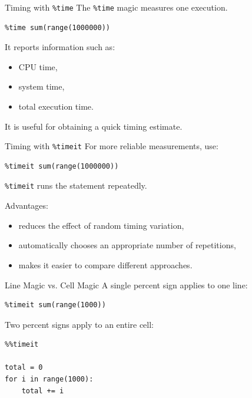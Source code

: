 \documentclass[aspectratio=169]{beamer}
\begin{document}
\begin{frame}[fragile]{Timing with \texttt{\%time}}
The \texttt{\%time} magic measures one execution.

\begin{lstlisting}
%time sum(range(1000000))
\end{lstlisting}

It reports information such as:
\begin{itemize}
    \item CPU time,
    \item system time,
    \item total execution time.
\end{itemize}

\vspace{0.3cm}

It is useful for obtaining a quick timing estimate.
\end{frame}

\begin{frame}[fragile]{Timing with \texttt{\%timeit}}
For more reliable measurements, use:

\begin{lstlisting}
%timeit sum(range(1000000))
\end{lstlisting}

\texttt{\%timeit} runs the statement repeatedly.

\vspace{0.3cm}

Advantages:
\begin{itemize}
    \item reduces the effect of random timing variation,
    \item automatically chooses an appropriate number of repetitions,
    \item makes it easier to compare different approaches.
\end{itemize}
\end{frame}

\begin{frame}[fragile]{Line Magic vs. Cell Magic}
A single percent sign applies to one line:

\begin{lstlisting}
%timeit sum(range(1000))
\end{lstlisting}

Two percent signs apply to an entire cell:

\begin{lstlisting}
%%timeit

total = 0
for i in range(1000):
    total += i
\end{lstlisting}
\end{frame}
\end{document}

